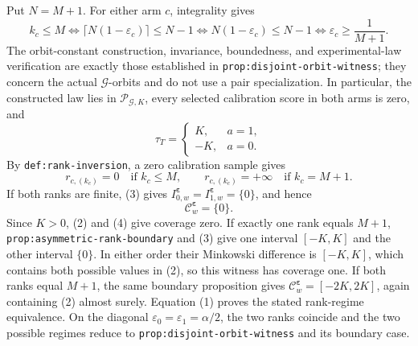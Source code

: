 Put \(N=M+1\). For either arm \(c\), integrality gives
\[
k_c\le M\Longleftrightarrow \lceil N(1-\varepsilon_c)\rceil\le N-1\Longleftrightarrow N(1-\varepsilon_c)\le N-1\Longleftrightarrow \varepsilon_c\ge\frac1{M+1}.
\tag{1}
\]
The orbit-constant construction, invariance, boundedness, and experimental-law verification are exactly those established in \texttt{prop:disjoint-orbit-witness}; they concern the actual \(\mathcal G\)-orbits and do not use a pair specialization. In particular, the constructed law lies in \(\mathcal P_{\mathcal G,K}\), every selected calibration score in both arms is zero, and
\[
\tau_T=\begin{cases}K,&a=1,\\-K,&a=0.\end{cases}
\tag{2}
\]
By \texttt{def:rank-inversion}, a zero calibration sample gives
\[
r_{c,(k_c)}=0\quad \text{if }k_c\le M,\qquad r_{c,(k_c)}=+\infty\quad \text{if }k_c=M+1.
\tag{3}
\]
If both ranks are finite, (3) gives \(I^{\boldsymbol\varepsilon}_{0,w}=I^{\boldsymbol\varepsilon}_{1,w}=\{0\}\), and hence
\[
\mathcal C^{\boldsymbol\varepsilon}_w=\{0\}.
\tag{4}
\]
Since \(K>0\), (2) and (4) give coverage zero. If exactly one rank equals \(M+1\), \texttt{prop:asymmetric-rank-boundary} and (3) give one interval \([-K,K]\) and the other interval \(\{0\}\). In either order their Minkowski difference is \([-K,K]\), which contains both possible values in (2), so this witness has coverage one. If both ranks equal \(M+1\), the same boundary proposition gives \(\mathcal C^{\boldsymbol\varepsilon}_w=[-2K,2K]\), again containing (2) almost surely. Equation (1) proves the stated rank-regime equivalence. On the diagonal \(\varepsilon_0=\varepsilon_1=\alpha/2\), the two ranks coincide and the two possible regimes reduce to \texttt{prop:disjoint-orbit-witness} and its boundary case.